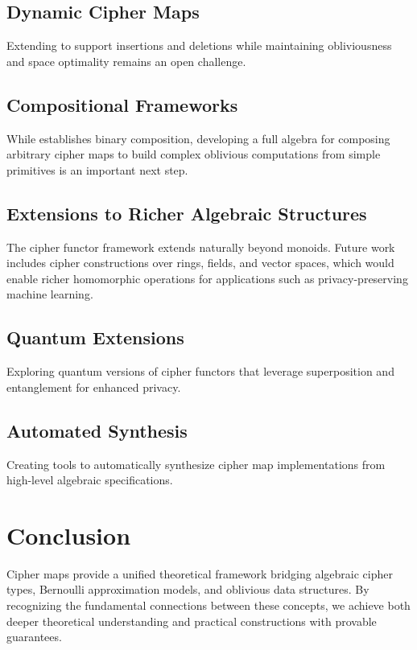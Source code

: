 \documentclass[11pt]{article}
\theoremstyle{definition}
\theoremstyle{plain}
\theoremstyle{remark}
\begin{document}
\subsection{Dynamic Cipher Maps}

Extending to support insertions and deletions while maintaining obliviousness and space optimality remains an open challenge.

\subsection{Compositional Frameworks}

While  establishes binary composition, developing a full algebra for composing arbitrary cipher maps to build complex oblivious computations from simple primitives is an important next step.

\subsection{Extensions to Richer Algebraic Structures}

The cipher functor framework extends naturally beyond monoids. Future work includes cipher constructions over rings, fields, and vector spaces, which would enable richer homomorphic operations for applications such as privacy-preserving machine learning.

\subsection{Quantum Extensions}

Exploring quantum versions of cipher functors that leverage superposition and entanglement for enhanced privacy.

\subsection{Automated Synthesis}

Creating tools to automatically synthesize cipher map implementations from high-level algebraic specifications.

\section{Conclusion}
\label{sec:conclusion}

Cipher maps provide a unified theoretical framework bridging algebraic cipher types, Bernoulli approximation models, and oblivious data structures. By recognizing the fundamental connections between these concepts, we achieve both deeper theoretical understanding and practical constructions with provable guarantees.
\end{document}

